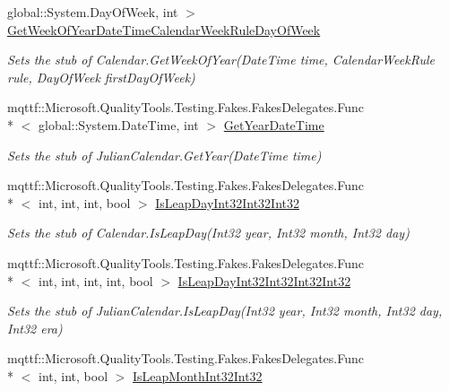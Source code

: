 \begin{DoxyCompactItemize}
global\-::\-System.\-Day\-Of\-Week, int $>$ \hyperlink{class_system_1_1_globalization_1_1_fakes_1_1_stub_julian_calendar_a8804a6d27ed2089cae5fdba378e79c1e}{Get\-Week\-Of\-Year\-Date\-Time\-Calendar\-Week\-Rule\-Day\-Of\-Week}
\begin{DoxyCompactList}\small\item\em Sets the stub of Calendar.\-Get\-Week\-Of\-Year(\-Date\-Time time, Calendar\-Week\-Rule rule, Day\-Of\-Week first\-Day\-Of\-Week)\end{DoxyCompactList}\item 
mqttf\-::\-Microsoft.\-Quality\-Tools.\-Testing.\-Fakes.\-Fakes\-Delegates.\-Func\\*
$<$ global\-::\-System.\-Date\-Time, int $>$ \hyperlink{class_system_1_1_globalization_1_1_fakes_1_1_stub_julian_calendar_a0ddd14741fbba0d4eb42cb519a1d59b3}{Get\-Year\-Date\-Time}
\begin{DoxyCompactList}\small\item\em Sets the stub of Julian\-Calendar.\-Get\-Year(\-Date\-Time time)\end{DoxyCompactList}\item 
mqttf\-::\-Microsoft.\-Quality\-Tools.\-Testing.\-Fakes.\-Fakes\-Delegates.\-Func\\*
$<$ int, int, int, bool $>$ \hyperlink{class_system_1_1_globalization_1_1_fakes_1_1_stub_julian_calendar_a754be12d9cc63eea9c6232767b0d8f18}{Is\-Leap\-Day\-Int32\-Int32\-Int32}
\begin{DoxyCompactList}\small\item\em Sets the stub of Calendar.\-Is\-Leap\-Day(\-Int32 year, Int32 month, Int32 day)\end{DoxyCompactList}\item 
mqttf\-::\-Microsoft.\-Quality\-Tools.\-Testing.\-Fakes.\-Fakes\-Delegates.\-Func\\*
$<$ int, int, int, int, bool $>$ \hyperlink{class_system_1_1_globalization_1_1_fakes_1_1_stub_julian_calendar_a5d66c62a44ade3e45eb841d50fa1232b}{Is\-Leap\-Day\-Int32\-Int32\-Int32\-Int32}
\begin{DoxyCompactList}\small\item\em Sets the stub of Julian\-Calendar.\-Is\-Leap\-Day(\-Int32 year, Int32 month, Int32 day, Int32 era)\end{DoxyCompactList}\item 
mqttf\-::\-Microsoft.\-Quality\-Tools.\-Testing.\-Fakes.\-Fakes\-Delegates.\-Func\\*
$<$ int, int, bool $>$ \hyperlink{class_system_1_1_globalization_1_1_fakes_1_1_stub_julian_calendar_a2edcc00e00a820c113307bdb1d6c9777}{Is\-Leap\-Month\-Int32\-Int32}

\end{DoxyCompactItemize}
